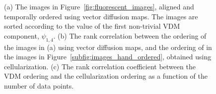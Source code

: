 \documentclass{pnastwo}
\begin{document}
\begin{figure}
\begin{minipage}{0.4\textwidth}
\begin{subfigure}{\textwidth}
\caption{}
\label{subfig:bootstrap}
\end{subfigure}
\end{minipage}
\caption{(a) The images in Figure~\ref{fig:fluorescent_images}, aligned and temporally ordered using vector diffusion maps. The images are sorted according to the value of the first non-trivial VDM component, $\psi_{1, 4}$. (b) The rank correlation between the ordering of the images in (a) using vector diffusion maps, and the ordering of in the images in Figure~\ref{subfig:images_hand_ordered}, obtained using cellularization. (c) The rank correlation coefficient between the VDM ordering and the cellularization ordering as a function of the number of data points. }
\end{figure}

\end{document}
